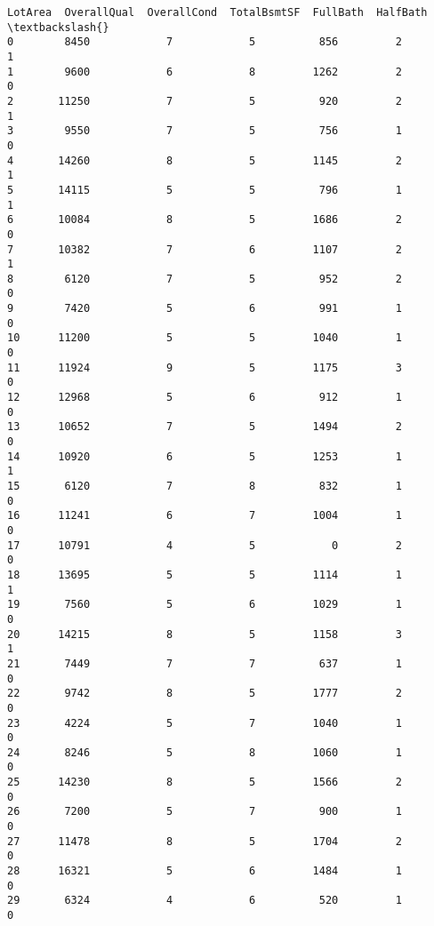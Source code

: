 \documentclass[11pt]{article}
\newcommand{\prompt}[4]{
        \llap{{\color{#2}[#3]: #4}}\vspace{-1.25em}
    }
\begin{document}
            \begin{tcolorbox}[breakable, boxrule=.5pt, size=fbox, pad at break*=1mm, opacityfill=0]
\prompt{Out}{outcolor}{10}{\hspace{3.5pt}}
\begin{Verbatim}[commandchars=\\\{\}]
      LotArea  OverallQual  OverallCond  TotalBsmtSF  FullBath  HalfBath  \textbackslash{}
0        8450            7            5          856         2         1
1        9600            6            8         1262         2         0
2       11250            7            5          920         2         1
3        9550            7            5          756         1         0
4       14260            8            5         1145         2         1
5       14115            5            5          796         1         1
6       10084            8            5         1686         2         0
7       10382            7            6         1107         2         1
8        6120            7            5          952         2         0
9        7420            5            6          991         1         0
10      11200            5            5         1040         1         0
11      11924            9            5         1175         3         0
12      12968            5            6          912         1         0
13      10652            7            5         1494         2         0
14      10920            6            5         1253         1         1
15       6120            7            8          832         1         0
16      11241            6            7         1004         1         0
17      10791            4            5            0         2         0
18      13695            5            5         1114         1         1
19       7560            5            6         1029         1         0
20      14215            8            5         1158         3         1
21       7449            7            7          637         1         0
22       9742            8            5         1777         2         0
23       4224            5            7         1040         1         0
24       8246            5            8         1060         1         0
25      14230            8            5         1566         2         0
26       7200            5            7          900         1         0
27      11478            8            5         1704         2         0
28      16321            5            6         1484         1         0
29       6324            4            6          520         1         0

\end{Verbatim}
\end{tcolorbox}
\end{document}
